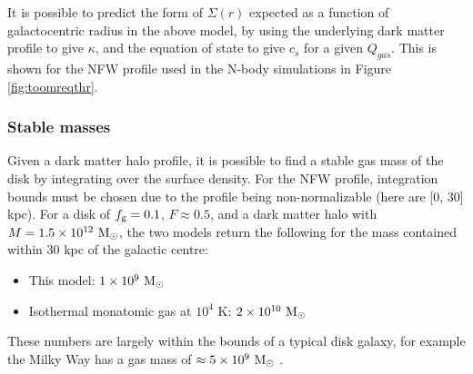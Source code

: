 It is possible to predict the form of $\Sigma(r)$ expected as a function of galactocentric radius in the above model, by using the underlying dark matter profile to give $\kappa$, and the equation of state to give $c_s$ for a given $Q_{gas}$.
This is shown for the NFW profile used in the N-body simulations in Figure \ref{fig:toomreqthr}.

\subsubsection{Stable masses}

Given a dark matter halo profile, it is possible to find a stable gas mass of the disk by integrating over the surface density.
For the NFW profile, integration bounds must be chosen due to the profile being non-normalizable (here are [0, 30] kpc).
For a disk of $f_\mathrm{g}=0.1$, $F \approx 0.5$, and a dark matter halo with $M = 1.5\times10^{12} ~\mathrm{M}_{\odot}$, the two models return the following for the mass contained within 30 kpc of the galactic centre:
\begin{itemize}
    \item This model: $1 \times 10^9 ~\mathrm{M}_{\odot}$
    \item Isothermal monatomic gas at $10^4$ K: $2 \times 10^{10}~\mathrm{M}_{\odot}$
\end{itemize}
These numbers are largely within the bounds of a typical disk galaxy, for example the Milky Way has a gas mass of $\approx 5\times10^9 ~\mathrm{M}_{\odot}$ \citep{licquia_improved_2013}.
